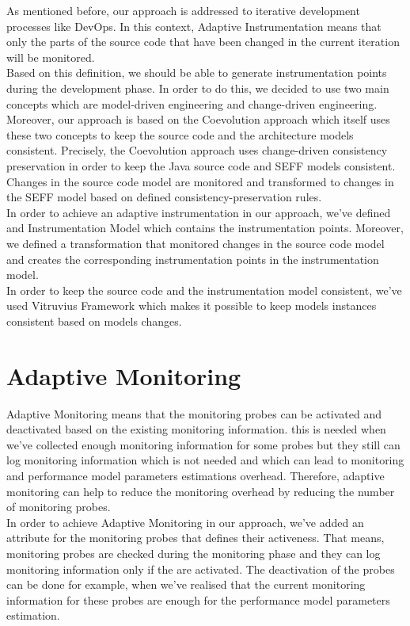 As mentioned before, our approach is addressed to iterative development processes like DevOps. In this context, Adaptive Instrumentation means that only the parts of the source code that have been changed in the current iteration will be monitored. \\

Based on this definition, we should be able to generate instrumentation points during the development phase. In order to do this, we decided to use two main concepts which are model-driven engineering and change-driven engineering. Moreover, our approach is based on the Coevolution approach which itself uses these two concepts to keep the source code and the architecture models consistent. Precisely, the Coevolution approach uses change-driven consistency preservation in order to keep the Java source code and SEFF models consistent. Changes in the source code model are monitored and transformed to changes in the SEFF model based on defined consistency-preservation rules. \\

In order to achieve an adaptive instrumentation in our approach, we’ve defined and Instrumentation Model which contains the instrumentation points. Moreover, we defined a transformation that monitored changes in the source code model and creates the corresponding instrumentation points in the instrumentation model. \\

In order to keep the source code and the instrumentation model consistent, we've used Vitruvius Framework which makes it possible to keep models instances consistent based on models changes. 

\section{Adaptive Monitoring}
\label{sec:Adaptive Monitoring}
Adaptive Monitoring means that the monitoring probes can be activated and deactivated based on the existing monitoring information. this is needed when we’ve collected enough monitoring information for some probes but they still can log monitoring information which is not needed and which can lead to monitoring and performance model parameters estimations overhead.  Therefore, adaptive monitoring can help to reduce the monitoring overhead by reducing the number of monitoring probes. \\

In order to achieve Adaptive Monitoring in our approach, we've added an attribute for the monitoring probes that defines their activeness. That means, monitoring probes are checked during the monitoring phase and they can log monitoring information only if the are activated. The deactivation of the probes can be done for example, when we've realised that the current monitoring information for these probes are enough for the performance model parameters estimation.\\

